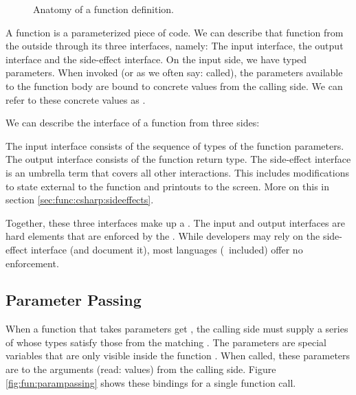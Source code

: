 \begin{figure}[tbp]
  
  \caption{Anatomy of a function definition.}
  \label{fig:fun:anatomy}
\end{figure}

A function is a parameterized piece of code. We can describe that function from the outside through its three interfaces, namely: The input interface, the output interface and the side-effect interface. On the input side, we have typed parameters. When invoked (or as we often say: called), the parameters available to the function body are bound to concrete values from the calling side. We can refer to these concrete values as . %

We can describe the interface of a function from three sides:
\begin{enumerate}
   The input interface consists of the sequence of types of the function parameters.
   The output interface consists of the function return type.
   The side-effect interface is an umbrella term that covers all other interactions. This includes modifications to state external to the function and printouts to the screen. More on this in section \ref{sec:func:csharp:sideeffects}.
\end{enumerate}

Together, these three interfaces make up a . The input and output interfaces are hard elements that are enforced by the . While developers may rely on the side-effect interface (and document it), most languages (\csharp\ included) offer no enforcement.

\subsection{Parameter Passing}

When a function that takes parameters get , the calling side must supply a series of  whose types satisfy those from the matching . The parameters are special variables that are only visible inside the function . When called, these parameters are  to the arguments (read: values) from the calling side. Figure \ref{fig:fun:parampassing} shows these bindings for a single function call.

